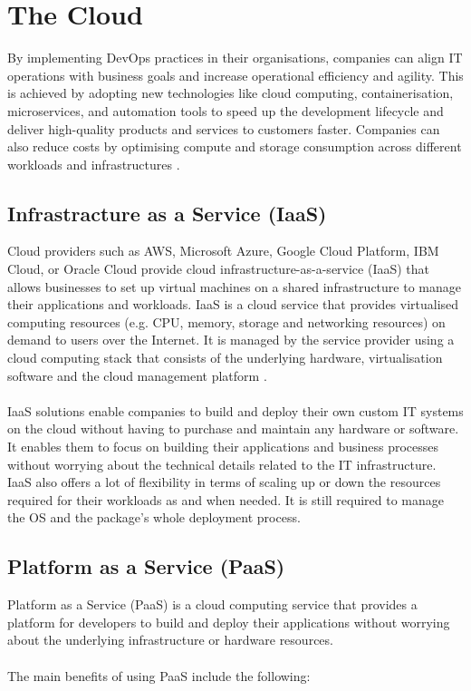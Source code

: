 \documentclass[BIF,Master,nenglish]{twbook}%
\begin{document}
\section{The Cloud}
By implementing DevOps practices in their organisations, companies can align IT operations with business goals and increase operational efficiency and agility. This is achieved by adopting new technologies like cloud computing, containerisation, microservices, and automation tools to speed up the development lifecycle and deliver high-quality products and services to customers faster. Companies can also reduce costs by optimising compute and storage consumption across different workloads and infrastructures \cite{qia2009}.

\subsection{Infrastracture as a Service (IaaS)}
Cloud providers such as AWS, Microsoft Azure, Google Cloud Platform, IBM Cloud, or Oracle Cloud provide cloud infrastructure-as-a-service (IaaS) that allows businesses to set up virtual machines on a shared infrastructure to manage their applications and workloads. IaaS is a cloud service that provides virtualised computing resources (e.g. CPU, memory, storage and networking resources) on demand to users over the Internet. It is managed by the service provider using a cloud computing stack that consists of the underlying hardware, virtualisation software and the cloud management platform \cite{buy2019} .
\\
\\
IaaS solutions enable companies to build and deploy their own custom IT systems on the cloud without having to purchase and maintain any hardware or software. It enables them to focus on building their applications and business processes without worrying about the technical details related to the IT infrastructure. IaaS also offers a lot of flexibility in terms of scaling up or down the resources required for their workloads as and when needed. It is still required to manage the OS and the package's whole deployment process.

\subsection{Platform as a Service (PaaS)}
Platform as a Service (PaaS) is a cloud computing service that provides a platform for developers to build and deploy their applications without worrying about the underlying infrastructure or hardware resources. 
\\
\\
The main benefits of using PaaS include the following: 
\end{document}
